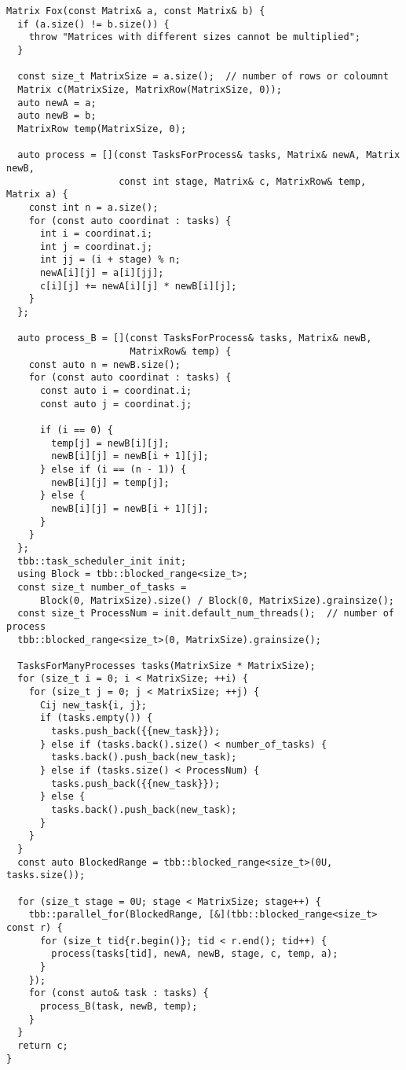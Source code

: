 \documentclass{report}
\begin{document}
\begin{lstlisting}
Matrix Fox(const Matrix& a, const Matrix& b) {
  if (a.size() != b.size()) {
    throw "Matrices with different sizes cannot be multiplied";
  }

  const size_t MatrixSize = a.size();  // number of rows or coloumnt
  Matrix c(MatrixSize, MatrixRow(MatrixSize, 0));
  auto newA = a;
  auto newB = b;
  MatrixRow temp(MatrixSize, 0);

  auto process = [](const TasksForProcess& tasks, Matrix& newA, Matrix newB,
                    const int stage, Matrix& c, MatrixRow& temp, Matrix a) {
    const int n = a.size();
    for (const auto coordinat : tasks) {
      int i = coordinat.i;
      int j = coordinat.j;
      int jj = (i + stage) % n;
      newA[i][j] = a[i][jj];
      c[i][j] += newA[i][j] * newB[i][j];
    }
  };

  auto process_B = [](const TasksForProcess& tasks, Matrix& newB,
                      MatrixRow& temp) {
    const auto n = newB.size();
    for (const auto coordinat : tasks) {
      const auto i = coordinat.i;
      const auto j = coordinat.j;

      if (i == 0) {
        temp[j] = newB[i][j];
        newB[i][j] = newB[i + 1][j];
      } else if (i == (n - 1)) {
        newB[i][j] = temp[j];
      } else {
        newB[i][j] = newB[i + 1][j];
      }
    }
  };
  tbb::task_scheduler_init init;
  using Block = tbb::blocked_range<size_t>;
  const size_t number_of_tasks =
      Block(0, MatrixSize).size() / Block(0, MatrixSize).grainsize();
  const size_t ProcessNum = init.default_num_threads();  // number of process
  tbb::blocked_range<size_t>(0, MatrixSize).grainsize();

  TasksForManyProcesses tasks(MatrixSize * MatrixSize);
  for (size_t i = 0; i < MatrixSize; ++i) {
    for (size_t j = 0; j < MatrixSize; ++j) {
      Cij new_task{i, j};
      if (tasks.empty()) {
        tasks.push_back({{new_task}});
      } else if (tasks.back().size() < number_of_tasks) {
        tasks.back().push_back(new_task);
      } else if (tasks.size() < ProcessNum) {
        tasks.push_back({{new_task}});
      } else {
        tasks.back().push_back(new_task);
      }
    }
  }
  const auto BlockedRange = tbb::blocked_range<size_t>(0U, tasks.size());

  for (size_t stage = 0U; stage < MatrixSize; stage++) {
    tbb::parallel_for(BlockedRange, [&](tbb::blocked_range<size_t> const r) {
      for (size_t tid{r.begin()}; tid < r.end(); tid++) {
        process(tasks[tid], newA, newB, stage, c, temp, a);
      }
    });
    for (const auto& task : tasks) {
      process_B(task, newB, temp);
    }
  }
  return c;
}
 \end{lstlisting}
\end{document}
